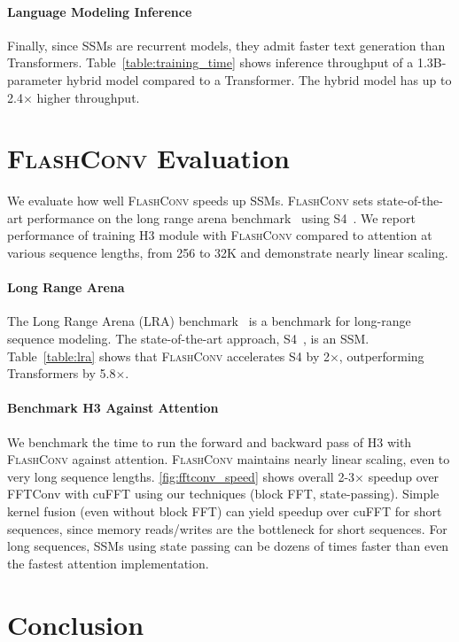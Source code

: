 \paragraph{Language Modeling Inference} Finally, since SSMs are recurrent models, they admit faster text generation than Transformers.
Table~\ref{table:training_time} shows inference throughput of a 1.3B-parameter hybrid model compared to a Transformer. The hybrid model has up to 2.4$\times$ higher throughput.

\section{\textsc{FlashConv} Evaluation \label{sec:eval_efficiency}}
We evaluate how well \textsc{FlashConv} speeds up SSMs.
\textsc{FlashConv} sets state-of-the-art performance on the long range arena benchmark~\citep{tay2020long} using S4~\citep{gu2022efficiently}. We report performance of training \textsc{H3} module with \textsc{FlashConv} compared to attention at various sequence lengths, from 256 to 32K and demonstrate nearly linear scaling.

\paragraph{Long Range Arena} The Long Range Arena (LRA) benchmark~\citep{tay2020long} is a benchmark for long-range sequence modeling. The state-of-the-art approach, S4~\citep{gu2022train}, is an SSM.
Table~\ref{table:lra} shows that \textsc{FlashConv} accelerates S4 by 2$\times$, outperforming Transformers by 5.8$\times$.

\paragraph{Benchmark \textsc{H3} Against Attention} We benchmark the time to run the forward and backward pass of \textsc{H3} with \textsc{FlashConv} against attention.
\textsc{FlashConv} maintains nearly linear scaling, even to very long sequence lengths.
\ref{fig:fftconv_speed} shows overall 2-3$\times$ speedup over FFTConv with cuFFT using our techniques (block FFT, state-passing). Simple kernel fusion (even without block FFT) can yield speedup over cuFFT for short sequences, since memory reads/writes are the bottleneck for short sequences. For long sequences, SSMs using state passing can be dozens of times faster than even the fastest attention implementation.

\section{Conclusion}
\label{sec:conc}

